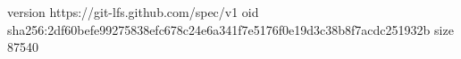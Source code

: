version https://git-lfs.github.com/spec/v1
oid sha256:2df60befe99275838efc678c24e6a341f7e5176f0e19d3c38b8f7acdc251932b
size 87540
